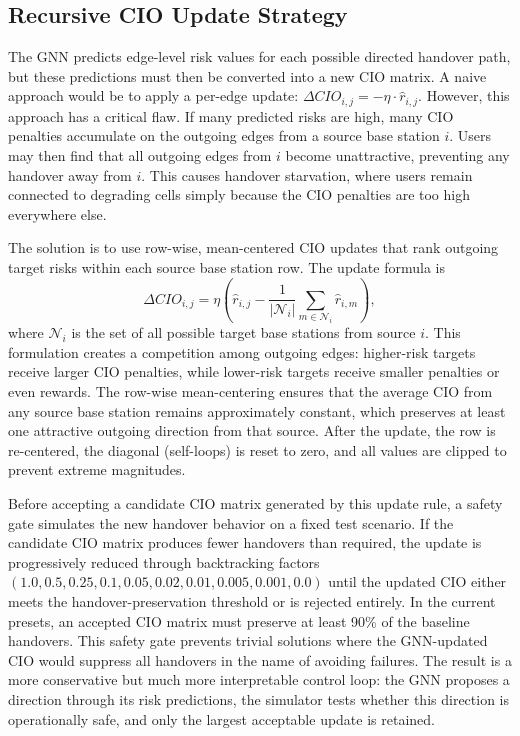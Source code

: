 \documentclass[11pt,a4paper]{article}
\begin{document}
\subsection{Recursive CIO Update Strategy}
The GNN predicts edge-level risk values for each possible directed handover path, but these predictions must then be converted into a new CIO matrix. A naive approach would be to apply a per-edge update: $\Delta CIO_{i,j} = -\eta \cdot \hat{r}_{i,j}$. However, this approach has a critical flaw. If many predicted risks are high, many CIO penalties accumulate on the outgoing edges from a source base station $i$. Users may then find that all outgoing edges from $i$ become unattractive, preventing any handover away from $i$. This causes handover starvation, where users remain connected to degrading cells simply because the CIO penalties are too high everywhere else.

The solution is to use row-wise, mean-centered CIO updates that rank outgoing target risks within each source base station row. The update formula is
\begin{equation}
\Delta CIO_{i,j} = \eta \left( \hat{r}_{i,j} - \frac{1}{|\mathcal{N}_i|} \sum_{m \in \mathcal{N}_i} \hat{r}_{i,m} \right),
\end{equation}
where $\mathcal{N}_i$ is the set of all possible target base stations from source $i$. This formulation creates a competition among outgoing edges: higher-risk targets receive larger CIO penalties, while lower-risk targets receive smaller penalties or even rewards. The row-wise mean-centering ensures that the average CIO from any source base station remains approximately constant, which preserves at least one attractive outgoing direction from that source. After the update, the row is re-centered, the diagonal (self-loops) is reset to zero, and all values are clipped to prevent extreme magnitudes.

Before accepting a candidate CIO matrix generated by this update rule, a safety gate simulates the new handover behavior on a fixed test scenario. If the candidate CIO matrix produces fewer handovers than required, the update is progressively reduced through backtracking factors $(1.0, 0.5, 0.25, 0.1, 0.05, 0.02, 0.01, 0.005, 0.001, 0.0)$ until the updated CIO either meets the handover-preservation threshold or is rejected entirely. In the current presets, an accepted CIO matrix must preserve at least 90\% of the baseline handovers. This safety gate prevents trivial solutions where the GNN-updated CIO would suppress all handovers in the name of avoiding failures. The result is a more conservative but much more interpretable control loop: the GNN proposes a direction through its risk predictions, the simulator tests whether this direction is operationally safe, and only the largest acceptable update is retained.
\end{document}
